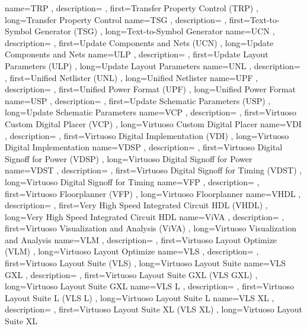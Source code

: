 { name={TRP}
, description={}
, first={Transfer Property Control (TRP)}
, long={Transfer Property Control}
}
{ name={TSG}
, description={}
, first={Text-to-Symbol Generator (TSG)}
, long={Text-to-Symbol Generator}
}
{ name={UCN}
, description={}
, first={Update Components and Nets (UCN)}
, long={Update Components and Nets}
}
{ name={ULP}
, description={}
, first={Update Layout Parameters (ULP)}
, long={Update Layout Parameters}
}
{ name={UNL}
, description={}
, first={Unified Netlister (UNL)}
, long={Unified Netlister}
}
{ name={UPF}
, description={}
, first={Unified Power Format (UPF)}
, long={Unified Power Format}
}
{ name={USP}
, description={}
, first={Update Schematic Parameters (USP)}
, long={Update Schematic Parameters}
}
{ name={VCP}
, description={}
, first={Virtuoso Custom Digital Placer (VCP)}
, long={Virtuoso Custom Digital Placer}
}
{ name={VDI}
, description={}
, first={Virtuoso Digital Implementation (VDI)}
, long={Virtuoso Digital Implementation}
}
{ name={VDSP}
, description={}
, first={Virtuoso Digital Signoff for Power (VDSP)}
, long={Virtuoso Digital Signoff for Power}
}
{ name={VDST}
, description={}
, first={Virtuoso Digital Signoff for Timing (VDST)}
, long={Virtuoso Digital Signoff for Timing}
}
{ name={VFP}
, description={}
, first={Virtuoso Floorplanner (VFP)}
, long={Virtuoso Floorplanner}
}
{ name={VHDL}
, description={}
, first={Very High Speed Integrated Circuit HDL (VHDL)}
, long={Very High Speed Integrated Circuit HDL}
}
{ name={ViVA}
, description={}
, first={Virtuoso Visualization and Analysis (ViVA)}
, long={Virtuoso Visualization and Analysis}
}
{ name={VLM}
, description={}
, first={Virtuoso Layout Optimize (VLM)}
, long={Virtuoso Layout Optimize}
}
{ name={VLS}
, description={}
, first={Virtuoso Layout Suite (VLS)}
, long={Virtuoso Layout Suite}
}
{ name={VLS GXL}
, description={}
, first={Virtuoso Layout Suite GXL (VLS GXL)}
, long={Virtuoso Layout Suite GXL}
}
{ name={VLS L}
, description={}
, first={Virtuoso Layout Suite L (VLS L)}
, long={Virtuoso Layout Suite L}
}
{ name={VLS XL}
, description={}
, first={Virtuoso Layout Suite XL (VLS XL)}
, long={Virtuoso Layout Suite XL}
}

